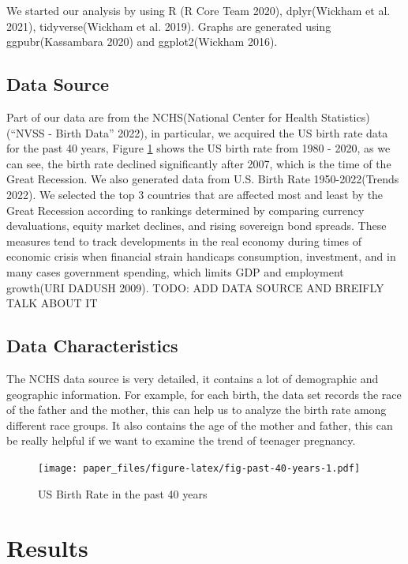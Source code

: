 \documentclass[
]{article}
\begin{document}
We started our analysis by using R (R Core Team 2020), dplyr(Wickham et al. 2021), tidyverse(Wickham et al. 2019). Graphs are generated using ggpubr(Kassambara 2020) and ggplot2(Wickham 2016).

\hypertarget{data-source}{%
\subsection{Data Source}\label{data-source}}

Part of our data are from the NCHS(National Center for Health Statistics)({``NVSS - Birth Data''} 2022), in particular, we acquired the US birth rate data for the past 40 years, Figure \ref{fig:fig-past-40-years} shows the US birth rate from 1980 - 2020, as we can see, the birth rate declined significantly after 2007, which is the time of the Great Recession. We also generated data from U.S. Birth Rate 1950-2022(Trends 2022). We selected the top 3 countries that are affected most and least by the Great Recession according to rankings determined by comparing currency devaluations, equity market declines, and rising sovereign bond spreads. These measures tend to track developments in the real economy during times of economic crisis when financial strain handicaps consumption, investment, and in many cases government spending, which limits GDP and employment growth(URI DADUSH 2009). TODO: ADD DATA SOURCE AND BREIFLY TALK ABOUT IT

\hypertarget{data-characteristics}{%
\subsection{Data Characteristics}\label{data-characteristics}}

The NCHS data source is very detailed, it contains a lot of demographic and geographic information. For example, for each birth, the data set records the race of the father and the mother, this can help us to analyze the birth rate among different race groups. It also contains the age of the mother and father, this can be really helpful if we want to examine the trend of teenager pregnancy.

\begin{figure}
\centering
\texttt{[image: paper\_files/figure-latex/fig-past-40-years-1.pdf]}
\caption{\label{fig:fig-past-40-years}US Birth Rate in the past 40 years}
\end{figure}

\hypertarget{results}{%
\section{Results}\label{results}}
\end{document}

